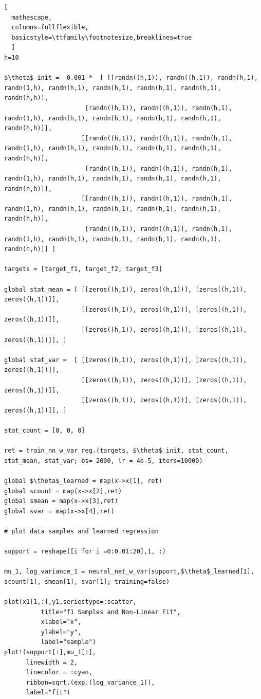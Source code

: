 \documentclass[12pt,letter]{article}
\begin{document}
\begin{enumerate}
\begin{lstlisting}[
  mathescape,
  columns=fullflexible,
  basicstyle=\ttfamily\footnotesize,breaklines=true
  ]
h=10

$\theta$_init =  0.001 *  [ [[randn((h,1)), randn((h,1)), randn(h,1), randn(1,h), randn(h,1), randn(h,1), randn(h,1), randn(h,1), randn(h,h)],
                      [randn((h,1)), randn((h,1)), randn(h,1), randn(1,h), randn(h,1), randn(h,1), randn(h,1), randn(h,1), randn(h,h)]],
                     [[randn((h,1)), randn((h,1)), randn(h,1), randn(1,h), randn(h,1), randn(h,1), randn(h,1), randn(h,1), randn(h,h)],
                      [randn((h,1)), randn((h,1)), randn(h,1), randn(1,h), randn(h,1), randn(h,1), randn(h,1), randn(h,1), randn(h,h)]],
                     [[randn((h,1)), randn((h,1)), randn(h,1), randn(1,h), randn(h,1), randn(h,1), randn(h,1), randn(h,1), randn(h,h)],
                      [randn((h,1)), randn((h,1)), randn(h,1), randn(1,h), randn(h,1), randn(h,1), randn(h,1), randn(h,1), randn(h,h)]] ]

targets = [target_f1, target_f2, target_f3]

global stat_mean = [ [[zeros((h,1)), zeros((h,1))], [zeros((h,1)), zeros((h,1))]],
                     [[zeros((h,1)), zeros((h,1))], [zeros((h,1)), zeros((h,1))]],
                     [[zeros((h,1)), zeros((h,1))], [zeros((h,1)), zeros((h,1))]], ]

global stat_var =  [ [[zeros((h,1)), zeros((h,1))], [zeros((h,1)), zeros((h,1))]],
                     [[zeros((h,1)), zeros((h,1))], [zeros((h,1)), zeros((h,1))]],
                     [[zeros((h,1)), zeros((h,1))], [zeros((h,1)), zeros((h,1))]], ]

stat_count = [0, 0, 0]

ret = train_nn_w_var_reg.(targets, $\theta$_init, stat_count, stat_mean, stat_var; bs= 2000, lr = 4e-5, iters=10000)

global $\theta$_learned = map(x->x[1], ret)
global scount = map(x->x[2],ret)
global smean = map(x->x[3],ret)
global svar = map(x->x[4],ret)

# plot data samples and learned regression

support = reshape([i for i =0:0.01:20],1, :)

mu_1, log_variance_1 = neural_net_w_var(support,$\theta$_learned[1], scount[1], smean[1], svar[1]; training=false)

plot(x1[1,:],y1,seriestype=:scatter,
          title="f1 Samples and Non-Linear Fit",
          xlabel="x",
          ylabel="y",
          label="sample")
plot!(support[:],mu_1[:],
      linewidth = 2,
      linecolor = :cyan,
      ribbon=sqrt.(exp.(log_variance_1)),
      label="fit")


\end{lstlisting}
\end{enumerate}
\end{document}
